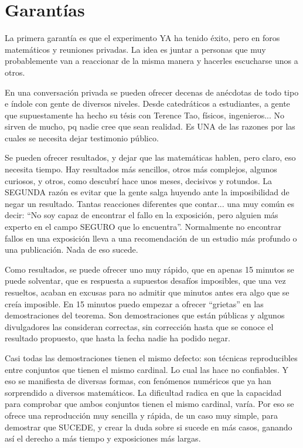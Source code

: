 \chapter{Garantías}

\noindent
La primera garantía es que el experimento YA ha tenido éxito, pero en foros matemáticos y reuniones privadas. La idea es juntar a personas que muy probablemente van a reaccionar de la misma manera y hacerles escucharse unos a otros.

\noindent
En una conversación privada se pueden ofrecer decenas de anécdotas de todo tipo e índole con gente de diversos niveles. Desde catedráticos a estudiantes, a gente que supuestamente ha hecho su tésis con Terence Tao, físicos, ingenieros... No sirven de mucho, pq nadie cree que sean realidad. Es UNA de las razones por las cuales se necesita dejar testimonio público.

\noindent
Se pueden ofrecer resultados, y dejar que las matemáticas hablen, pero claro, eso necesita tiempo. Hay resultados más sencillos, otros más complejos, algunos curiosos, y otros, como descubrí hace unos meses, decisivos y rotundos. La SEGUNDA razón es evitar que la gente salga huyendo ante la imposibilidad de negar un resultado. Tantas reacciones diferentes que contar... una muy común es decir: ``No soy capaz de encontrar el fallo en la exposición, pero alguien más experto en el campo SEGURO que lo encuentra''. Normalmente no encontrar fallos en una exposición lleva a una recomendación de un estudio más profundo o una publicación. Nada de eso sucede.

\noindent
Como resultados, se puede ofrecer uno muy rápido, que en apenas 15 minutos se puede solventar, que es respuesta a supuestos desafíos imposibles, que una vez resueltos, acaban en excusas para no admitir que minutos antes era algo que se creía imposible. En 15 minutos puedo empezar a ofrecer ``grietas'' en las demostraciones del teorema. Son demostraciones que están públicas y algunos divulgadores las consideran correctas, sin corrección hasta que se conoce el resultado propuesto, que hasta la fecha nadie ha podido negar.

\noindent
Casi todas las demostraciones tienen el mismo defecto: son técnicas reproducibles entre conjuntos que tienen el mismo cardinal. Lo cual las hace no confiables. Y eso se manifiesta de diversas formas, con fenómenos numéricos que ya han sorprendido a diversos matemáticos. La dificultad radica en que la capacidad para comprobar que ambos conjuntos tienen el mismo cardinal, varía. Por eso se ofrece una reproducción muy sencilla y rápida, de un caso muy simple, para demostrar que SUCEDE, y crear la duda sobre si sucede en más casos, ganando así el derecho a más tiempo y exposiciones más largas.

